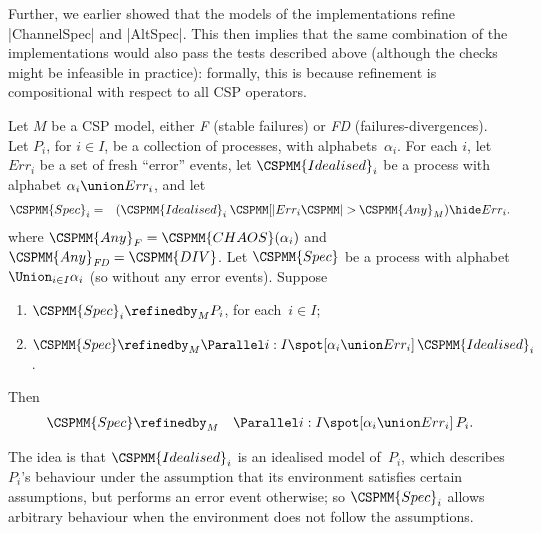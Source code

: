 Further, we earlier showed that the models of the implementations refine
|ChannelSpec| and |AltSpec|.  This then implies that the same combination of
the implementations would also pass the tests described above (although the
checks might be infeasible in practice): formally, this is because refinement
is compositional with respect to all CSP operators.



\def\Idealised{\CSPMM{Idealised}}
\def\Spec{\CSPMM{Spec}}

\begin{prop}
Let $M$ be a CSP model, either {\it F} (stable failures) or {\it FD}
(failures-divergences).  Let $P_i$, for $i \in I$, be a collection of
processes, with alphabets~$\alpha_i$.  For each $i$, let $Err_i$ be a set of
fresh ``error'' events, let $\Idealised_i$ be a process with alphabet
$\alpha_i \union Err_i$, and let
\begin{eqnarray*}
\Spec_i & = & (\Idealised_i \throw{Err_i} \CSPMM{Any}_M) \hide Err_i.
\end{eqnarray*} 
where $\CSPMM{Any}_F = \CSPMM{CHAOS}(\alpha_i)$ and $\CSPMM{Any}_{\it FD} =
\CSPMM{DIV}$.
%
Let $\Spec$ be a process with alphabet $\Union_{i \in I} \alpha_i$ (so without
any error events).  Suppose
\begin{enumerate}
\item\label{rg-1} $\Spec_i \refinedby_M P_i$, for each~$i \in I$;

\item\label{rg-2} $\Spec \refinedby_M 
 \Parallel i:I \spot [\alpha_i \union Err_i] \, \Idealised_i$. 
\end{enumerate}
Then
\begin{eqnarray*}
\Spec & \refinedby_M & \Parallel i:I \spot [\alpha_i \union Err_i] \, P_i.
\end{eqnarray*}
\end{prop}
%
The idea is that $\Idealised_i$ is an idealised model of~$P_i$, which
describes $P_i$'s behaviour under the assumption that its environment
satisfies certain assumptions, but performs an error event otherwise; so
$\Spec_i$ allows arbitrary behaviour when the environment does not follow the
assumptions.
%

